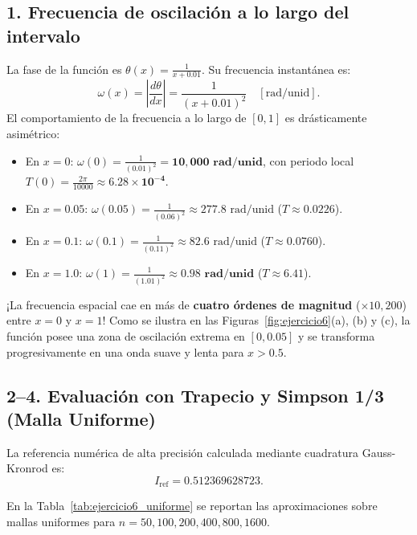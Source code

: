 \documentclass[11pt,a4paper]{article}
\begin{document}
\subsection{1. Frecuencia de oscilación a lo largo del intervalo}
La fase de la función es $\theta(x) = \frac{1}{x + 0.01}$. Su frecuencia instantánea es:
\begin{equation}
    \omega(x) = \left| \frac{d\theta}{dx} \right| = \frac{1}{(x + 0.01)^2} \quad [\text{rad/unid}].
\end{equation}
El comportamiento de la frecuencia a lo largo de $[0, 1]$ es drásticamente asimétrico:
\begin{itemize}
    \item En $x = 0$: $\omega(0) = \frac{1}{(0.01)^2} = \mathbf{10{,}000\text{ rad/unid}}$, con periodo local $T(0) = \frac{2\pi}{10000} \approx \mathbf{6.28 \times 10^{-4}}$.
    \item En $x = 0.05$: $\omega(0.05) = \frac{1}{(0.06)^2} \approx 277.8\text{ rad/unid}$ ($T \approx 0.0226$).
    \item En $x = 0.1$: $\omega(0.1) = \frac{1}{(0.11)^2} \approx 82.6\text{ rad/unid}$ ($T \approx 0.0760$).
    \item En $x = 1.0$: $\omega(1) = \frac{1}{(1.01)^2} \approx \mathbf{0.98\text{ rad/unid}}$ ($T \approx \mathbf{6.41}$).
\end{itemize}
¡La frecuencia espacial cae en más de \textbf{cuatro órdenes de magnitud} ($\times 10{,}200$) entre $x = 0$ y $x = 1$! Como se ilustra en las Figuras~\ref{fig:ejercicio6}(a), (b) y (c), la función posee una zona de oscilación extrema en $[0, 0.05]$ y se transforma progresivamente en una onda suave y lenta para $x > 0.5$.

\subsection{2--4. Evaluación con Trapecio y Simpson 1/3 (Malla Uniforme)}
La referencia numérica de alta precisión calculada mediante cuadratura Gauss-Kronrod es:
\begin{equation}
    I_{\text{ref}} = \mathbf{0.512369628723}.
\end{equation}

En la Tabla~\ref{tab:ejercicio6_uniforme} se reportan las aproximaciones sobre mallas uniformes para $n = 50, 100, 200, 400, 800, 1600$.
\end{document}
